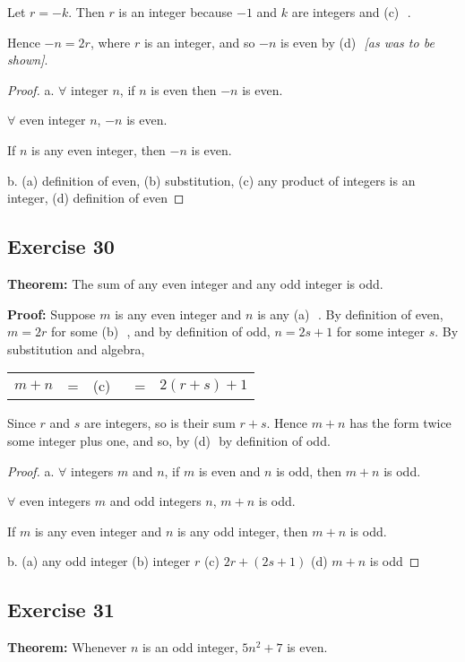 \documentclass[14pt]{extarticle}
\newcommand{\fbl}{\underline{\hspace{1cm}}\,\,}
\newcommand{\fa}{\forall}
\newcommand{\cy}{\color{cyan}}
\begin{document}
Let $r = -k$. Then $r$ is an integer because $-1$ and $k$ are integers and {\cy (c)} \fbl. 

Hence $-n = 2r$, where $r$ is an integer, and so $-n$ is even by {\cy (d)} \fbl {\it [as was to be shown]}.

\begin{proof}
a. $\fa$ integer $n$, if $n$ is even then $-n$ is even.

$\fa$ even integer $n$, $-n$ is even.

If $n$ is any even integer, then $-n$ is even.

b. (a) definition of even, (b) substitution, (c) any product of integers is an integer, (d) definition of even
\end{proof}

\subsection{Exercise 30}
{\bf Theorem:} The sum of any even integer and any odd integer is odd.

{\bf Proof:} Suppose $m$ is any even integer and $n$ is any {\cy (a)} \fbl. By definition of even, $m = 2r$ for some {\cy (b)} \fbl, and by definition of odd, $n = 2s + 1$ for some integer $s$. By substitution and algebra,

\begin{center}
\begin{tabular}{ccccc}
$m+n$ & = & {\cy (c)} \fbl & = & $2(r+s)+1$ \\
\end{tabular}
\end{center}

Since $r$ and $s$ are integers, so is their sum $r+s$. Hence $m+n$ has the form twice some integer plus one, and so, by {\cy (d)} \fbl by definition of odd.

\begin{proof}
a. $\fa$ integers $m$ and $n$, if $m$ is even and $n$ is odd, then $m + n$ is odd.

$\fa$ even integers $m$ and odd integers $n$, $m + n$ is odd.

If $m$ is any even integer and $n$ is any odd integer,
then $m + n$ is odd.

b. (a) any odd integer (b) integer $r$ (c) $2r + (2s + 1)$ (d) $m + n$ is odd
\end{proof}

\subsection{Exercise 31}
{\bf Theorem:} Whenever $n$ is an odd integer, $5n^2 + 7$ is even.
\end{document}
